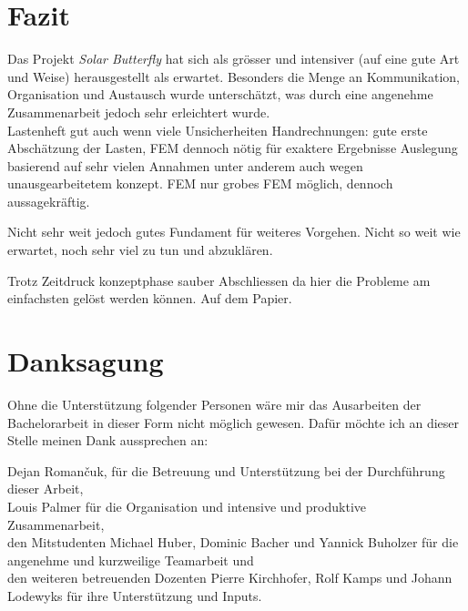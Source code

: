 \section{Fazit}
Das Projekt \emph{Solar Butterfly} hat sich als grösser und intensiver (auf eine gute Art und Weise) herausgestellt als erwartet. Besonders die Menge an Kommunikation, Organisation und Austausch wurde unterschätzt, was durch eine angenehme Zusammenarbeit jedoch sehr erleichtert wurde.\\


Lastenheft gut auch wenn viele Unsicherheiten
Handrechnungen: gute erste Abschätzung der Lasten, FEM dennoch nötig für exaktere Ergebnisse
Auslegung basierend auf sehr vielen Annahmen unter anderem auch wegen unausgearbeitetem konzept.
FEM nur grobes FEM möglich, dennoch aussagekräftig.


Nicht sehr weit jedoch gutes Fundament für weiteres Vorgehen.
Nicht so weit wie erwartet, noch sehr viel zu tun und abzuklären.

Trotz Zeitdruck konzeptphase sauber Abschliessen da hier die Probleme am einfachsten gelöst werden können. Auf dem Papier.


\newpage

\section{Danksagung}
Ohne die Unterstützung folgender Personen wäre mir das Ausarbeiten der Bachelorarbeit in dieser Form nicht möglich gewesen. Dafür möchte ich an dieser Stelle meinen Dank aussprechen an:

Dejan Roman\v{c}uk, für die Betreuung und Unterstützung bei der Durchführung dieser Arbeit,\\
Louis Palmer für die Organisation und intensive und produktive Zusammenarbeit,\\
den Mitstudenten Michael Huber, Dominic Bacher und Yannick Buholzer für die angenehme und kurzweilige Teamarbeit und\\
den weiteren betreuenden Dozenten Pierre Kirchhofer, Rolf Kamps und Johann Lodewyks für ihre Unterstützung und Inputs.
\newpage
